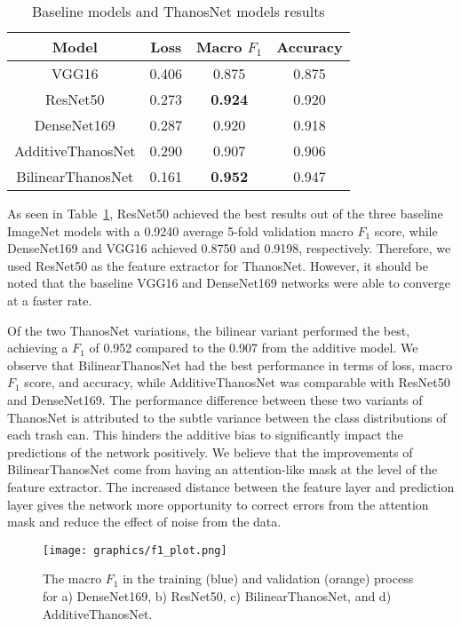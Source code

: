\documentclass[conference]{ieeeconf}
\begin{document}
\begin{table}[b]
\centering
    \begin{tabular}{|c|c|c|c|}
    \hline
    Model & Loss & Macro $F_1$ & Accuracy \\ \hline
    VGG16 & 0.406& 0.875 & 0.875 \\ \hline
    ResNet50 & 0.273  & \textbf{0.924} & 0.920 \\ \hline
    DenseNet169 & 0.287 & 0.920 & 0.918\\ \hline
    AdditiveThanosNet & 0.290 & 0.907 & 0.906 \\ \hline
    BilinearThanosNet & 0.161 & \textbf{0.952} & 0.947 \\ \hline
    \end{tabular}
\caption{Baseline models and ThanosNet models results}
\label{table:results}
\end{table}
As seen in Table~\ref{table:results}, ResNet50 achieved the best results out of the three baseline ImageNet models with a 0.9240 average 5-fold validation macro $F_1$ score, while DenseNet169 and VGG16 achieved 0.8750 and 0.9198, respectively. Therefore, we used ResNet50 as the feature extractor for ThanosNet. However, it should be noted that the baseline VGG16 and DenseNet169 networks were able to converge at a faster rate. 

Of the two ThanosNet variations, the bilinear variant performed the best, achieving a $F_1$ of 0.952 compared to the 0.907 from the additive model. We observe that BilinearThanosNet had the best performance in terms of loss, macro $F_1$ score, and accuracy, while AdditiveThanosNet was comparable with ResNet50 and DenseNet169. The performance difference between these two variants of ThanosNet is attributed to the subtle variance between the class distributions of each trash can. This hinders the additive bias to significantly impact the predictions of the network positively. We believe that the improvements of BilinearThanosNet come from having an attention-like mask at the level of the feature extractor. The increased distance between the feature layer and prediction layer gives the network more opportunity to correct errors from the attention mask and reduce the effect of noise from the data. 

\begin{figure}
  \centering
  \texttt{[image: graphics/f1\_plot.png]}
  \caption{The macro $F_1$ in the training (blue) and validation (orange) process for a) DenseNet169, b) ResNet50, c) BilinearThanosNet, and d) AdditiveThanosNet.}
  \label{fig:f1plot}
\end{figure}
\end{document}
